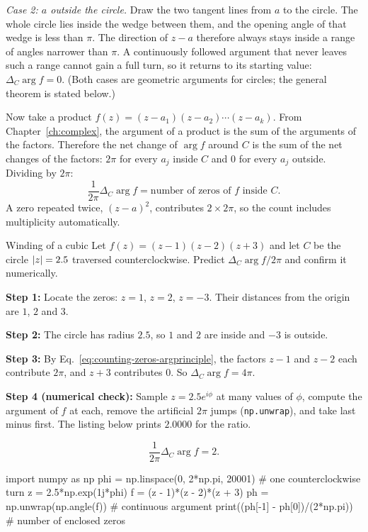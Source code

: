 \emph{Case 2: $a$ outside the circle.} Draw the two tangent lines from $a$ to the circle. The whole circle lies inside the wedge between them, and the opening angle of that wedge is less than $\pi$. The direction of $z-a$ therefore always stays inside a range of angles narrower than $\pi$. A continuously followed argument that never leaves such a range cannot gain a full turn, so it returns to its starting value: $\Delta_C\arg f=0$. (Both cases are geometric arguments for circles; the general theorem is stated below.)

Now take a product $f(z)=(z-a_1)(z-a_2)\cdots(z-a_k)$. From Chapter~\ref{ch:complex}, the argument of a product is the sum of the arguments of the factors. Therefore the net change of $\arg f$ around $C$ is the sum of the net changes of the factors: $2\pi$ for every $a_j$ inside $C$ and $0$ for every $a_j$ outside. Dividing by $2\pi$:
\begin{equation}
\frac{1}{2\pi}\Delta_C\arg f=\text{number of zeros of }f\text{ inside }C.
\label{eq:counting-zeros-argprinciple}
\end{equation}
A zero repeated twice, $(z-a)^2$, contributes $2\times2\pi$, so the count includes multiplicity automatically.

\begin{sample}{Winding of a cubic}
Let $f(z)=(z-1)(z-2)(z+3)$ and let $C$ be the circle $\left\lvert z\right\rvert=2.5$ traversed counterclockwise. Predict $\Delta_C\arg f/2\pi$ and confirm it numerically.

\textbf{Step 1:} Locate the zeros: $z=1$, $z=2$, $z=-3$. Their distances from the origin are $1$, $2$ and $3$.

\textbf{Step 2:} The circle has radius $2.5$, so $1$ and $2$ are inside and $-3$ is outside.

\textbf{Step 3:} By Eq.~\eqref{eq:counting-zeros-argprinciple}, the factors $z-1$ and $z-2$ each contribute $2\pi$, and $z+3$ contributes 0. So $\Delta_C\arg f=4\pi$.

\textbf{Step 4 (numerical check):} Sample $z=2.5e^{i\phi}$ at many values of $\phi$, compute the argument of $f$ at each, remove the artificial $2\pi$ jumps (\texttt{np.unwrap}), and take last minus first. The listing below prints $2.0000$ for the ratio.

\[
\boxed{\frac{1}{2\pi}\Delta_C\arg f=2.}
\]
\end{sample}

\begin{pycode}
import numpy as np
phi = np.linspace(0, 2*np.pi, 20001)     # one counterclockwise turn
z = 2.5*np.exp(1j*phi)
f = (z - 1)*(z - 2)*(z + 3)
ph = np.unwrap(np.angle(f))              # continuous argument
print((ph[-1] - ph[0])/(2*np.pi))        # number of enclosed zeros
\end{pycode}

